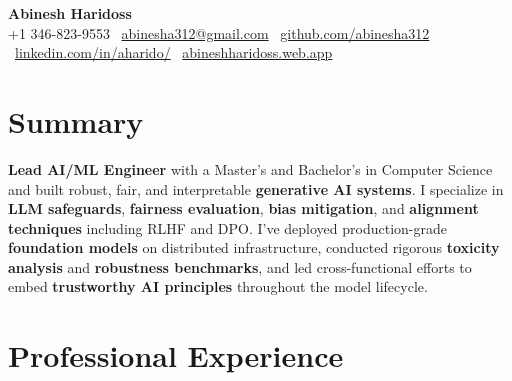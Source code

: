 \documentclass[11pt,a4paper]{article}
\begin{document}
\begin{center}
  {\LARGE \textbf{Abinesh Haridoss}}\\[4pt]
  +1 346-823-9553 \textbar\
  \href{mailto:abinesha312@gmail.com}{abinesha312@gmail.com} \textbar\
  \href{https://github.com/abinesha312}{github.com/abinesha312} \textbar\
  \href{https://www.linkedin.com/in/aharido/}{linkedin.com/in/aharido/} \textbar\
  \href{https://abineshharidoss.web.app/}{abineshharidoss.web.app}
\end{center}

\section*{Summary}
\textbf{Lead AI/ML Engineer} with a Master's and Bachelor's in Computer Science and built robust, fair, and interpretable \textbf{generative AI systems}. I specialize in \textbf{LLM safeguards}, \textbf{fairness evaluation}, \textbf{bias mitigation}, and \textbf{alignment techniques} including RLHF and DPO. I've deployed production-grade \textbf{foundation models} on distributed infrastructure, conducted rigorous \textbf{toxicity analysis} and \textbf{robustness benchmarks}, and led cross-functional efforts to embed \textbf{trustworthy AI principles} throughout the model lifecycle.

\section*{Professional Experience}
\end{document}
